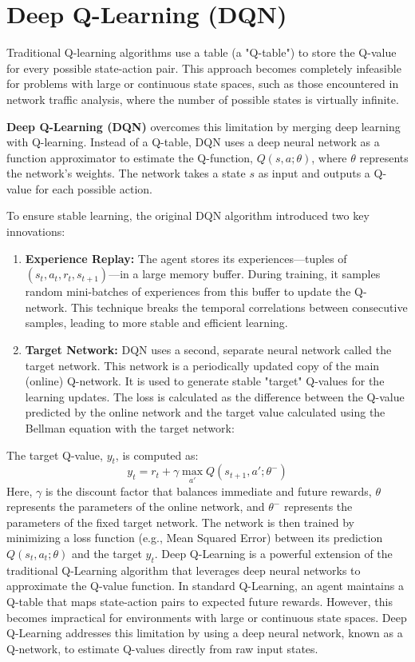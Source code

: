 \documentclass[12pt]{report}
\begin{document}
\section{Deep Q-Learning (DQN)}
Traditional Q-learning algorithms use a table (a "Q-table") to store the Q-value for every possible state-action pair. This approach becomes completely infeasible for problems with large or continuous state spaces, such as those encountered in network traffic analysis, where the number of possible states is virtually infinite.

\textbf{Deep Q-Learning (DQN)} overcomes this limitation by merging deep learning with Q-learning. Instead of a Q-table, DQN uses a deep neural network as a function approximator to estimate the Q-function, $Q(s, a; \theta)$, where $\theta$ represents the network's weights. The network takes a state $s$ as input and outputs a Q-value for each possible action.

To ensure stable learning, the original DQN algorithm introduced two key innovations:
\begin{enumerate}
    \item \textbf{Experience Replay:} The agent stores its experiences—tuples of $(s_t, a_t, r_t, s_{t+1})$—in a large memory buffer. During training, it samples random mini-batches of experiences from this buffer to update the Q-network. This technique breaks the temporal correlations between consecutive samples, leading to more stable and efficient learning.
    \item \textbf{Target Network:} DQN uses a second, separate neural network called the target network. This network is a periodically updated copy of the main (online) Q-network. It is used to generate stable "target" Q-values for the learning updates. The loss is calculated as the difference between the Q-value predicted by the online network and the target value calculated using the Bellman equation with the target network:
\end{enumerate}

The target Q-value, $y_t$, is computed as:
\begin{equation}
y_t = r_t + \gamma \max_{a'} Q(s_{t+1}, a'; \theta^-)
\end{equation}
Here, $\gamma$ is the discount factor that balances immediate and future rewards, $\theta$ represents the parameters of the online network, and $\theta^-$ represents the parameters of the fixed target network. The network is then trained by minimizing a loss function (e.g., Mean Squared Error) between its prediction $Q(s_t, a_t; \theta)$ and the target $y_t$.
 Deep Q-Learning is a powerful extension of the traditional Q-Learning algorithm that leverages deep neural networks to approximate the Q-value function. In standard Q-Learning, an agent maintains a Q-table that maps state-action pairs to expected future rewards. However, this becomes impractical for environments with large or continuous state spaces. Deep Q-Learning addresses this limitation by using a deep neural network, known as a Q-network, to estimate Q-values directly from raw input states.
\end{document}

